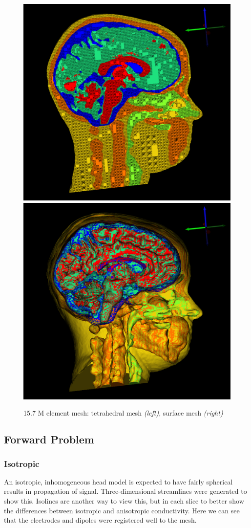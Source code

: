 \begin{figure}[H]
\begin{center}
\includegraphics[width=.49\textwidth]{Figures/smallmesh_2}
\includegraphics[width=.49\textwidth]{Figures/smallmesh_surface}
\caption{15.7 M element mesh: tetrahedral mesh \textit{(left)}, surface mesh \textit{(right)}}
\label{fig:smallmesh}
\end{center}
\end{figure}

\subsection{Forward Problem}

\subsubsection{Isotropic}

An isotropic, inhomogeneous head model is expected to have fairly spherical results in propagation of signal. Three-dimensional streamlines were generated to show this. Isolines are another way to view this, but in each slice to better show the differences between isotropic and anisotropic conductivity. Here we can see that the electrodes and dipoles were registered well to the mesh. 

